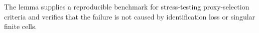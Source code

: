 The lemma supplies a reproducible benchmark for stress-testing proxy-selection criteria and verifies that the failure is not caused by identification loss or singular finite cells.